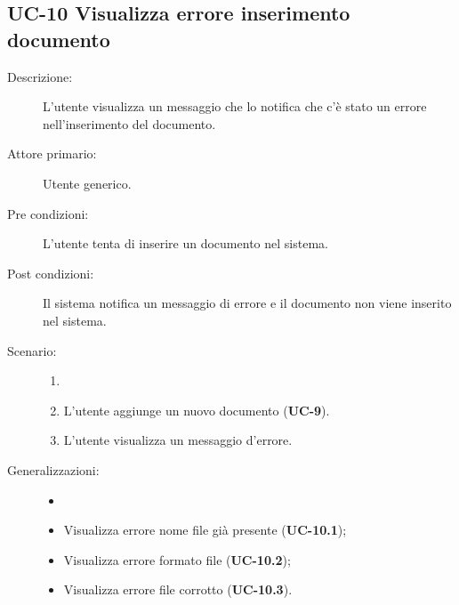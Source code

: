 \subsection{UC-10 Visualizza errore inserimento documento}
\begin{description}
    \item[Descrizione:] L'utente visualizza un messaggio che lo notifica che c'è stato un errore nell'inserimento del documento.
    \item[Attore primario:] Utente generico.
    \item[Pre condizioni:] L'utente tenta di inserire un documento nel sistema.
    \item[Post condizioni:] Il sistema notifica un messaggio di errore e il documento non viene inserito nel sistema.
    \item[Scenario:]
    \begin{enumerate}
        \item[]
        \item L’utente aggiunge un nuovo documento (\textbf{UC-9}).
        \item L'utente visualizza un messaggio d'errore.
    \end{enumerate}
    \item[Generalizzazioni:]
    \begin{itemize}
        \item[] 
        \item Visualizza errore nome file già presente (\textbf{UC-10.1});
        \item Visualizza errore formato file (\textbf{UC-10.2});
        \item Visualizza errore file corrotto (\textbf{UC-10.3}).
    \end{itemize}
\end{description}

